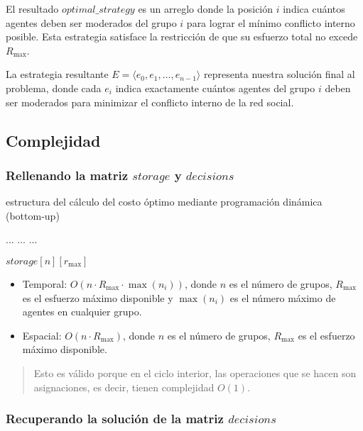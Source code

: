 El resultado $optimal\_strategy$ es un arreglo donde la posición $i$ indica cuántos agentes deben ser moderados del grupo $i$ para lograr el mínimo conflicto interno posible. Esta estrategia satisface la restricción de que su esfuerzo total no excede $R_{ \max }$.

La estrategia resultante $E = \langle e_0,e_1,\ldots,e_{ n - 1 } \rangle$ representa nuestra solución final al problema, donde cada $e_i$ indica exactamente cuántos agentes del grupo $i$ deben ser moderados para minimizar el conflicto interno de la red social.

\subsection{Complejidad}

\subsubsection{Rellenando la matriz $storage$ y $decisions$}

\begin{algorithm}[H]
	\caption{estructura del cálculo del costo óptimo mediante programación dinámica (bottom-up)}
	\begin{algorithmic}[1]
		\State ...
			\State ...
					\State ...
				\EndFor
			\EndFor
		\EndFor

		\State \Return $storage[n][r_{ \max }]$
	\end{algorithmic}
\end{algorithm}

\begin{itemize}
	\item Temporal: $O(n \cdot R_{ \max } \cdot \max(n_i))$, donde $n$ es el número de grupos, $R_{ \max }$ es el esfuerzo máximo disponible y $\max(n_i)$ es el número máximo de agentes en cualquier grupo.
	\item Espacial: $O(n \cdot R_{ \max })$, donde $n$ es el número de grupos, $R_{ \max }$ es el esfuerzo máximo disponible.
\end{itemize}

\begin{quote}
	Esto es válido porque en el ciclo interior, las operaciones que se hacen son asignaciones, es decir, tienen complejidad $O(1)$.
\end{quote}

\subsubsection{Recuperando la solución de la matriz $decisions$}

